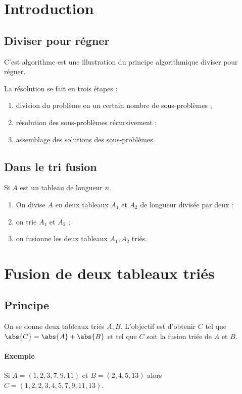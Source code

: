 \documentclass{mybourbaki}
\begin{document}
\section*{Introduction}
\subsection*{Diviser pour régner}

C'est algorithme est une illustration du principe algorithmique \og diviser pour régner\fg{}. 

La résolution se fait en trois étapes :
\begin{enumerate}
\item division du problème en un certain nombre de sous-problèmes ;
\item résolution des sous-problèmes récursivement ;
\item assemblage des solutions des sous-problèmes.
\end{enumerate}

\subsection*{Dans le tri fusion}
Si $A$ est un tableau de longueur $n$.
\begin{enumerate}
\item On divise $A$ en deux tableaux $A_1$ et $A_2$ de longueur divisée par deux :
\item on trie $A_1$ et $A_2$ ;
\item on fusionne les deux tableaux $A_1,A_2$ triés.
\end{enumerate}

\section{Fusion de deux tableaux triés}

\subsection{Principe}

On se donne deux tableaux triés $A,B$. L'objectif est d'obtenir $C$ tel que $\abs{C} = \abs{A} + \abs{B}$ et tel que $C$ soit la fusion triée de $A$ et $B$.

\paragraph{Exemple}Si $A = (1,2,3,7,9,11)$ et $B = (2,4,5,13)$ alors $C = (1,2,2,3,4,5,7,9,11,13)$.
\end{document}
